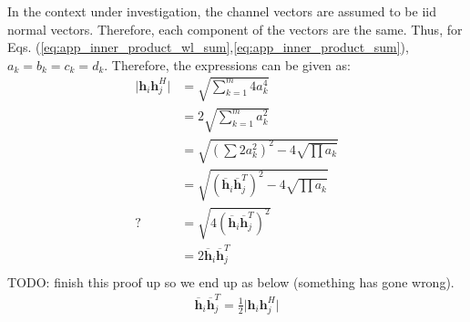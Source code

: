 In the context under investigation, the channel vectors are assumed to be iid normal vectors. Therefore, each component of the vectors are the same. Thus, for Eqs. (\ref{eq:app_inner_product_wl_sum},\ref{eq:app_inner_product_sum}), $a_k = b_k = c_k = d_k$. Therefore, the expressions can be given as:
\begin{equation}\label{eq:app_inner_product_sum}
    \begin{aligned}
       \vert\textbf{h}_i\textbf{h}_j^H\vert &= \sqrt{\sum_{k=1}^m 4a_k^4}\\
       &= 2\sqrt{\sum_{k=1}^m a_k^2}\\
       &= \sqrt{(\sum2{a_k^2})^2 - 4\sqrt{\prod a_k}}\\
       &= \sqrt{(\overline{\textbf{h}}_i \overline{\textbf{h}}_j^T)^2 - 4\sqrt{\prod a_k}}\\
       ?&= \sqrt{4(\overline{\textbf{h}}_i \overline{\textbf{h}}_j^T)^2 }\\
       &= 2\overline{\textbf{h}}_i \overline{\textbf{h}}_j^T\\
    \end{aligned}
\end{equation}
TODO: finish this proof up so we end up as below (something has gone wrong).
\begin{equation}\label{eq:app_inner_product}
    \begin{aligned}
       \overline{\textbf{h}}_i \overline{\textbf{h}}_j^T = \frac{1}{2}\vert \textbf{h}_i\textbf{h}_j^H \vert
    \end{aligned}
\end{equation}
